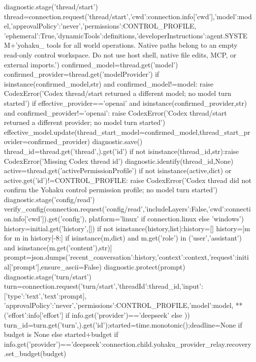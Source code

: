         diagnostic.stage('thread/start')
        thread=connection.request('thread/start',{'cwd':connection.info['cwd'],'model':model,'approvalPolicy':'never','permissions':CONTROL_PROFILE,
            'ephemeral':True,'dynamicTools':definitions,'developerInstructions':agent.SYSTEM+'\nUse yohaku_ tools for all world operations. Native paths belong to an empty read-only control workspace. Do not use host shell, native file edits, MCP, or external imports.'})
        confirmed_model=thread.get('model')
        confirmed_provider=thread.get('modelProvider')
        if isinstance(confirmed_model,str) and confirmed_model!=model:
            raise CodexError('Codex thread/start returned a different model; no model turn started')
        if effective_provider=='openai' and isinstance(confirmed_provider,str) and confirmed_provider!='openai':
            raise CodexError('Codex thread/start returned a different provider; no model turn started')
        effective_model.update(thread_start_model=confirmed_model,thread_start_provider=confirmed_provider)
        diagnostic.save()
        thread_id=thread.get('thread',{}).get('id')
        if not isinstance(thread_id,str):raise CodexError('Missing Codex thread id')
        diagnostic.identify(thread_id,None)
        active=thread.get('activePermissionProfile')
        if not isinstance(active,dict) or active.get('id')!=CONTROL_PROFILE:
            raise CodexError('Codex thread did not confirm the Yohaku control permission profile; no model turn started')
        diagnostic.stage('config/read')
        verify_config(connection.request('config/read',{'includeLayers':False,'cwd':connection.info['cwd']}).get('config'),
                      platform='linux' if connection.linux else 'windows')
        history=initial.get('history',[])
        if not isinstance(history,list):history=[]
        history=[m for m in history[-8:] if isinstance(m,dict) and m.get('role') in ('user','assistant') and isinstance(m.get('content'),str)]
        prompt=json.dumps({'recent_conversation':history,'context':context,'request':initial['prompt']},ensure_ascii=False)
        diagnostic.protect(prompt)
        diagnostic.stage('turn/start')
        turn=connection.request('turn/start',{'threadId':thread_id,'input':[{'type':'text','text':prompt}],
            'approvalPolicy':'never','permissions':CONTROL_PROFILE,'model':model,
            **({'effort':info['effort']} if info.get('provider')=='deepseek' else {})})
        turn_id=turn.get('turn',{}).get('id');started=time.monotonic();deadline=None if budget is None else started+budget
        if info.get('provider')=='deepseek':connection.child.yohaku_provider_relay.recovery.set_budget(budget)
